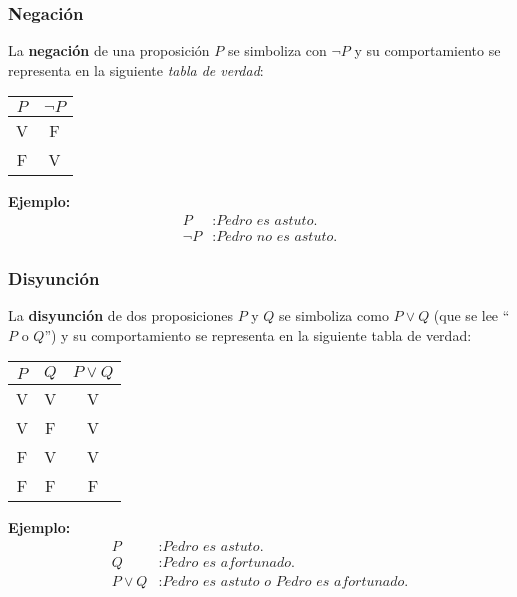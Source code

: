 \subsubsection{Negación}

La \textbf{negación} de una proposición $P$ se simboliza con $\neg P$ y su comportamiento se representa en la siguiente \textit{tabla de verdad}:

\begin{center}
    \begin{tabular}{c|c}
        $P$ & $\neg P$ \\
        \hline
        V & F \\
        F & V
    \end{tabular}
    \label{tab:tabla-negacion}
\end{center}

\textbf{Ejemplo:}
\begin{equation*}
    \begin{split}
        P &: \textit{Pedro es astuto.} \\
        \neg P &: \textit{Pedro no es astuto.}
    \end{split}
\end{equation*}

\subsubsection{Disyunción}

La \textbf{disyunción} de dos proposiciones $P$ y $Q$ se simboliza como $P \vee Q$ (que se lee ``$P$ o $Q$'') y su comportamiento se representa en la siguiente tabla de verdad:
                
\begin{center}
    \begin{tabular}{c|c|c}
        $P$ & $Q$ & $P \vee Q$  \\
        \hline
        V & V & V \\
        V & F & V \\
        F & V & V \\
        F & F & F
    \end{tabular}
    \label{tab:disyuncion-tabla}
\end{center}

\textbf{Ejemplo:}
\begin{equation*}
    \begin{split}
        P &: \textit{Pedro es astuto.} \\
        Q &: \textit{Pedro es afortunado.} \\
        P \vee Q &: \textit{Pedro es astuto o Pedro es afortunado.}
    \end{split}
\end{equation*}

